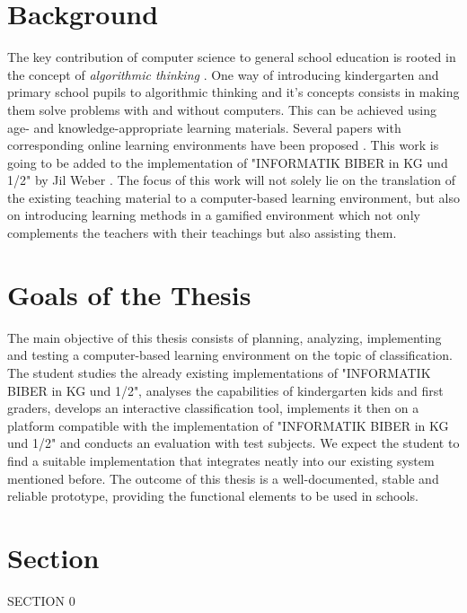 \section*{Background}
The key contribution of computer science to general school education is rooted
in the concept of \textit{algorithmic thinking} \cite{HKKS17}. One way of
introducing kindergarten and primary school pupils to algorithmic thinking and
it's concepts consists in making them solve problems with and without computers.
This can be achieved using age- and knowledge-appropriate learning materials.
Several papers with corresponding online learning environments have been
proposed \cite{STBLUM, SKAMP, TANGK, JWEBER}. This work is going to be added to
the implementation of "INFORMATIK BIBER in KG und 1/2" by Jil Weber
\cite{JWEBER}. The focus of this work will not solely lie on the translation of
the existing teaching material to a computer-based learning environment, but
also on introducing learning methods in a gamified environment which not only
complements the teachers with their teachings but also assisting them.

\section*{Goals of the Thesis}
The main objective of this thesis consists of planning, analyzing, implementing
and testing a computer-based learning environment on the topic of
classification. The student studies the already existing implementations of
"INFORMATIK BIBER in KG und 1/2", analyses the capabilities of kindergarten kids
and first graders, develops an interactive classification tool, implements it
then on a platform compatible with the implementation of "INFORMATIK BIBER in KG
und 1/2" and conducts an evaluation with test subjects. We expect the student to
find a suitable implementation that integrates neatly into our existing system
mentioned before. The outcome of this thesis is a well-documented, stable and
reliable prototype, providing the functional elements to be used in schools.

\section{Section}

SECTION 0
